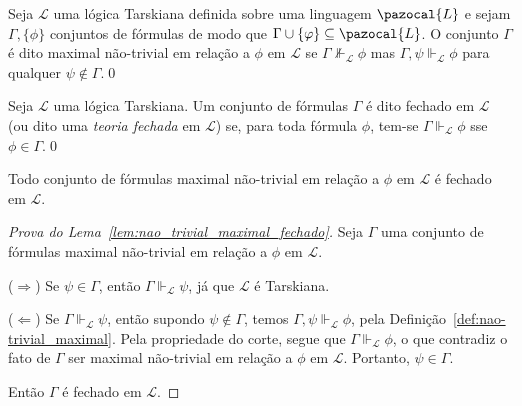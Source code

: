         \begin{definicao}\label{def:nao-trivial_maximal}
            Seja $\mathcal{L}$ uma lógica Tarskiana definida sobre uma linguagem $\pazocal{L}$ e sejam $\Gamma, \{\phi\}$ conjuntos de fórmulas de modo que $\Gamma \cup \{\phi\} \subseteq \pazocal{L}$. O conjunto $\Gamma$ é dito maximal não-trivial em relação a $\phi$ em $\mathcal{L}$ se $\Gamma \nVdash_{\mathcal{L}} \phi$ mas $\Gamma, \psi \Vdash_{\mathcal{L}} \phi$ para qualquer $\psi \notin \Gamma$.\qed{}
        \end{definicao}

        \begin{definicao}\label{def:fechada}

            Seja $\mathcal{L}$ uma lógica Tarskiana. Um conjunto de fórmulas $\Gamma$ é dito fechado em $\mathcal{L}$ (ou dito uma \textit{teoria fechada} em $\mathcal{L}$) se, para toda fórmula $\phi$, tem-se $\Gamma \Vdash_{\mathcal{L}} \phi$ sse $\phi \in \Gamma$.\qed{}
        \end{definicao}

        \begin{lema}\label{lem:nao_trivial_maximal_fechado}
            Todo conjunto de fórmulas maximal não-trivial em relação a $\phi$ em $\mathcal{L}$ é fechado em $\mathcal{L}$.
        \end{lema}

        \begin{proof}[Prova do Lema~\ref{lem:nao_trivial_maximal_fechado}]
            Seja $\Gamma$ uma conjunto de fórmulas maximal não-trivial em relação a $\phi$ em $\mathcal{L}$. 
            
            \noindent($\Longrightarrow$) Se $\psi \in \Gamma$, então $\Gamma \Vdash_{\mathcal{L}} \psi$, já que $\mathcal{L}$ é Tarskiana. 
            
            \noindent($\Longleftarrow$) Se $\Gamma \Vdash_{\mathcal{L}} \psi$, então supondo $\psi \notin \Gamma$, temos $\Gamma, \psi \Vdash_{\mathcal{L}} \phi$, pela Definição~\ref{def:nao-trivial_maximal}. Pela propriedade do corte, segue que $\Gamma \Vdash_{\mathcal{L}} \phi$, o que contradiz o fato de $\Gamma$ ser maximal não-trivial em relação a $\phi$ em $\mathcal{L}$. Portanto, $\psi \in \Gamma$.
            
            Então $\Gamma$ é fechado em $\mathcal{L}$.
        \end{proof}





